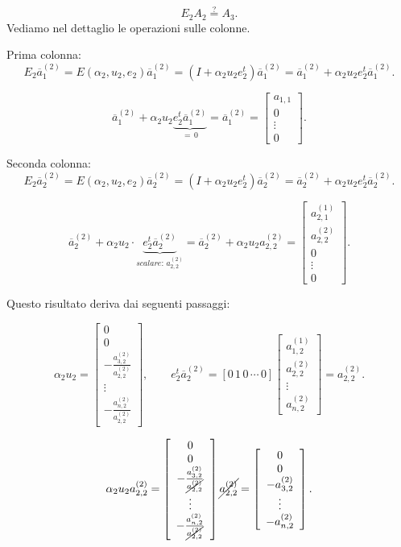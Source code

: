 \begin{dimo}
\[E_2A_2 \stackrel{?}{=} A_3.\]
Vediamo nel dettaglio le operazioni sulle colonne.

Prima colonna:
\[E_2\overline{a}_1^{(2)} = E(\alpha_2, u_2, e_2)\overline{a}_1^{(2)} =
(I + \alpha_2u_2e_2^t)\overline{a}_1^{(2)} = \overline{a}_1^{(2)} +
\alpha_2u_2e_2^t\overline{a}_1^{(2)}.
\]

\[
\overline{a}_1^{(2)} +
\alpha_2u_2\underbrace{e_2^t\overline{a}_1^{(2)}}_{= \,0} =
\overline{a}_1^{(2)} =
\left[\begin{array}{c}
a_{1,1}\\
0 \\
\vdots \\
0
\end{array}\right].
\]

Seconda colonna:
\[E_2\overline{a}_2^{(2)} = E(\alpha_2, u_2, e_2)\overline{a}_2^{(2)} =
(I + \alpha_2u_2e_2^t)\overline{a}_2^{(2)} = \overline{a}_2^{(2)} +
\alpha_2u_2e_2^t\overline{a}_2^{(2)}.
\]

\[
\overline{a}_2^{(2)} +
\alpha_2u_2\cdot\underbrace{e_2^t\overline{a}_2^{(2)}}_{scalare:\, a_{2,2}^{(2)}} =
\overline{a}_2^{(2)} + \alpha_2u_2a_{2,2}^{(2)} =
\left[\begin{array}{c}
a_{2,1}^{(1)} \\
a_{2,2}^{(2)} \\
0 \\
\vdots \\
0
\end{array}\right].
\]

Questo risultato deriva dai seguenti passaggi:

\[
\alpha_2u_2 = \left[\begin{array}{c}
0 \\
0 \\
-\frac{a_{3,2}^{(2)}}{a_{2,2}^{(2)}} \\
\vdots \\
-\frac{a_{n,2}^{(2)}}{a_{2,2}^{(2)}}
\end{array}\right],
\qquad
e_2^t\overline{a}_2^{(2)} = \left[0\,1\,0\,\cdots\,0\right]
\left[\begin{array}{c}
a_{1,2}^{(1)} \\
a_{2,2}^{(2)} \\
\vdots \\
a_{n,2}^{(2)}
\end{array}\right] = a_{2,2}^{(2)}.
\]

\[
\alpha_2u_2a_{2,2}^{(2)} =
\left[\begin{array}{c}
0 \\
0 \\
-\frac{a_{3,2}^{(2)}}{\cancel{a_{2,2}^{(2)}}} \\
\vdots \\
-\frac{a_{n,2}^{(2)}}{\cancel{a_{2,2}^{(2)}}}
\end{array}\right]\cancel{a_{2,2}^{(2)}} =
\left[\begin{array}{c}
0\\
0\\
-a_{3,2}^{(2)} \\
\vdots \\
-a_{n,2}^{(2)}
\end{array}\right].
\]


\end{dimo}
